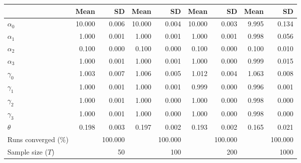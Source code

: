 
\begin{tabular}[t]{lrrrrrrrr}
\toprule
  & Mean & SD & Mean  & SD  & Mean   & SD   & Mean    & SD   \\
\midrule
$\alpha_{0}$ & 10.000 & 0.006 & 10.000 & 0.004 & 10.000 & 0.003 & 9.995 & 0.134\\
$\alpha_{1}$ & 1.000 & 0.001 & 1.000 & 0.001 & 1.000 & 0.001 & 0.998 & 0.056\\
$\alpha_{2}$ & 0.100 & 0.000 & 0.100 & 0.000 & 0.100 & 0.000 & 0.100 & 0.010\\
$\alpha_{3}$ & 1.000 & 0.001 & 1.000 & 0.001 & 1.000 & 0.000 & 0.999 & 0.015\\
$\gamma_{0}$ & 1.003 & 0.007 & 1.006 & 0.005 & 1.012 & 0.004 & 1.063 & 0.008\\
$\gamma_{1}$ & 1.000 & 0.001 & 1.000 & 0.001 & 0.999 & 0.000 & 0.996 & 0.001\\
$\gamma_{2}$ & 1.000 & 0.001 & 1.000 & 0.000 & 1.000 & 0.000 & 0.998 & 0.000\\
$\gamma_{3}$ & 1.000 & 0.001 & 1.000 & 0.000 & 1.000 & 0.000 & 0.998 & 0.000\\
$\theta$ & 0.198 & 0.003 & 0.197 & 0.002 & 0.193 & 0.002 & 0.165 & 0.021\\
Runs converged (\%) &  & 100.000 &  & 100.000 &  & 100.000 &  & 100.000\\
Sample size ($T$) &  & 50 &  & 100 &  & 200 &  & 1000\\
\bottomrule
\end{tabular}
